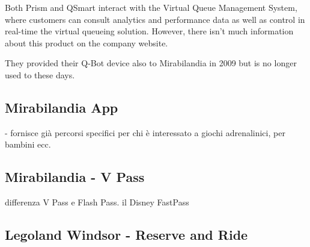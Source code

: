 Both Prism and QSmart interact with the Virtual Queue Management System, where customers can consult
analytics and performance data as well as control in real-time the virtual queueing solution.
However, there isn't much information about this product on the company website.

They provided their Q-Bot device also to Mirabilandia in 2009 but is no longer used to these days.


\subsection{Mirabilandia App}\label{subsec:mirabilandia-app}
- fornisce già percorsi specifici per chi è interessato a giochi adrenalinici, per bambini ecc.

\subsection{Mirabilandia - V Pass}\label{subsec:mirabilandia-v-pass}
differenza V Pass e Flash Pass.
il Disney FastPass

\subsection{Legoland Windsor - Reserve and Ride}\label{subsec:legoland-windsor---reserve-and-ride}
